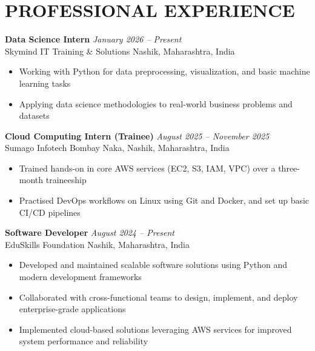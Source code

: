 \documentclass[11pt,a4paper]{article}
\begin{document}
\vspace{1pt}

\section*{PROFESSIONAL EXPERIENCE}

\textbf{Data Science Intern} \hfill \textit{January 2026 -- Present}\\
Skymind IT Training \& Solutions \hfill Nashik, Maharashtra, India
\begin{itemize}[leftmargin=15pt, itemsep=0pt, parsep=0pt, topsep=1pt]
    \item Working with Python for data preprocessing, visualization, and basic machine learning tasks
    \item Applying data science methodologies to real-world business problems and datasets
\end{itemize}

\vspace{1pt}

\textbf{Cloud Computing Intern (Trainee)} \hfill \textit{August 2025 -- November 2025}\\
Sumago Infotech \hfill Bombay Naka, Nashik, Maharashtra, India
\begin{itemize}[leftmargin=15pt, itemsep=0pt, parsep=0pt, topsep=1pt]
    \item Trained hands-on in core AWS services (EC2, S3, IAM, VPC) over a three-month traineeship
    \item Practised DevOps workflows on Linux using Git and Docker, and set up basic CI/CD pipelines
\end{itemize}

\vspace{1pt}

\textbf{Software Developer} \hfill \textit{August 2024 -- Present}\\
EduSkills Foundation \hfill Nashik, Maharashtra, India
\begin{itemize}[leftmargin=15pt, itemsep=0pt, parsep=0pt, topsep=1pt]
    \item Developed and maintained scalable software solutions using Python and modern development frameworks
    \item Collaborated with cross-functional teams to design, implement, and deploy enterprise-grade applications
    \item Implemented cloud-based solutions leveraging AWS services for improved system performance and reliability
\end{itemize}
\end{document}
